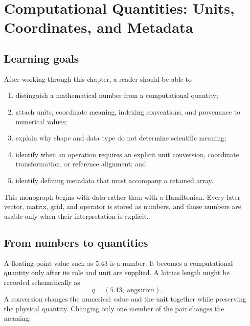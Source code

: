 \chapter{Computational Quantities: Units, Coordinates, and Metadata}

\label{ch:training-computational-quantities}


\section{Learning goals}

After working through this chapter, a reader should be able to

\begin{enumerate}
  \item distinguish a mathematical number from a computational quantity;
  \item attach units, coordinate meaning, indexing conventions, and provenance
        to numerical values;
  \item explain why shape and data type do not determine scientific meaning;
  \item identify when an operation requires an explicit unit conversion,
        coordinate transformation, or reference alignment; and
  \item identify defining metadata that must accompany a retained array.
\end{enumerate}

This monograph begins with data rather than with a Hamiltonian. Every later
vector, matrix, grid, and operator is stored as numbers, and those numbers are
usable only when their interpretation is explicit.

\section{From numbers to quantities}

A floating-point value such as \(5.43\) is a number. It becomes a computational
quantity only after its role and unit are supplied. A lattice length might be
recorded schematically as
\begin{equation}
  q=(5.43,\ \text{angstrom}).
\end{equation}
A conversion changes the numerical value and the unit together while preserving
the physical quantity. Changing only one member of the pair changes the
meaning.

